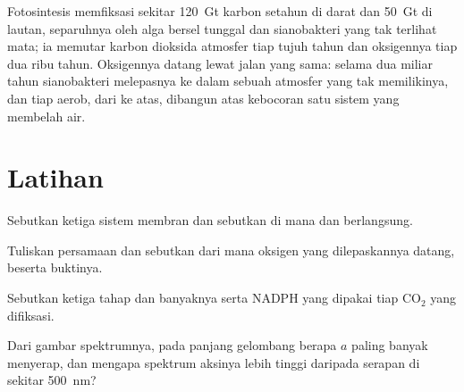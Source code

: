 \begin{example}\label{ex:b1:photosynthesis:global}
Fotosintesis memfiksasi sekitar \qty{120}{Gt} karbon setahun di darat
dan \qty{50}{Gt} di lautan, separuhnya oleh alga bersel tunggal dan
sianobakteri yang tak terlihat mata; ia memutar karbon dioksida
atmosfer tiap tujuh tahun dan oksigennya tiap dua ribu tahun. Oksigennya
datang lewat jalan yang sama: selama dua miliar tahun sianobakteri
melepasnya ke dalam sebuah atmosfer yang tak memilikinya, dan tiap
 aerob, dari  ke atas, dibangun atas kebocoran satu
sistem  yang membelah air.
\end{example}

\section{Latihan}

\begin{exercise}[$\star$]\label{exo:b1:photosynthesis:1}
Sebutkan ketiga sistem membran  dan sebutkan di mana  dan  berlangsung.
\end{exercise}

\begin{exercise}[$\star$]\label{exo:b1:photosynthesis:2}
Tuliskan persamaan  dan sebutkan dari mana oksigen yang
dilepaskannya datang, beserta buktinya.
\end{exercise}

\begin{exercise}[$\star$]\label{exo:b1:photosynthesis:3}
Sebutkan ketiga tahap  dan banyaknya  serta NADPH yang
dipakai tiap $\mathrm{CO_2}$ yang difiksasi.
\end{exercise}

\begin{exercise}[$\star$]\label{exo:b1:photosynthesis:4}
Dari gambar spektrumnya, pada panjang gelombang berapa  $a$
paling banyak menyerap, dan mengapa spektrum aksinya lebih tinggi
daripada serapan  di sekitar \qty{500}{nm}?
\end{exercise}

